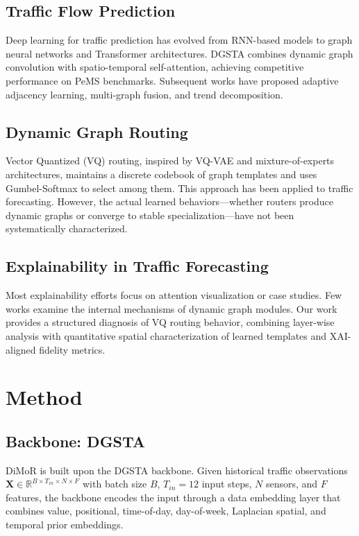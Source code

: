 \documentclass[journal]{IEEEtran}
\begin{document}
\subsection{Traffic Flow Prediction}

Deep learning for traffic prediction has evolved from RNN-based models to graph neural networks and Transformer architectures. DGSTA combines dynamic graph convolution with spatio-temporal self-attention, achieving competitive performance on PeMS benchmarks. Subsequent works have proposed adaptive adjacency learning, multi-graph fusion, and trend decomposition.

\subsection{Dynamic Graph Routing}

Vector Quantized (VQ) routing, inspired by VQ-VAE and mixture-of-experts architectures, maintains a discrete codebook of graph templates and uses Gumbel-Softmax to select among them. This approach has been applied to traffic forecasting. However, the actual learned behaviors---whether routers produce dynamic graphs or converge to stable specialization---have not been systematically characterized.

\subsection{Explainability in Traffic Forecasting}

Most explainability efforts focus on attention visualization or case studies. Few works examine the internal mechanisms of dynamic graph modules. Our work provides a structured diagnosis of VQ routing behavior, combining layer-wise analysis with quantitative spatial characterization of learned templates and XAI-aligned fidelity metrics.

\section{Method}

\subsection{Backbone: DGSTA}

DiMoR is built upon the DGSTA backbone. Given historical traffic observations $\mathbf{X} \in \mathbb{R}^{B \times T_{in} \times N \times F}$ with batch size $B$, $T_{in}=12$ input steps, $N$ sensors, and $F$ features, the backbone encodes the input through a data embedding layer that combines value, positional, time-of-day, day-of-week, Laplacian spatial, and temporal prior embeddings.
\end{document}
